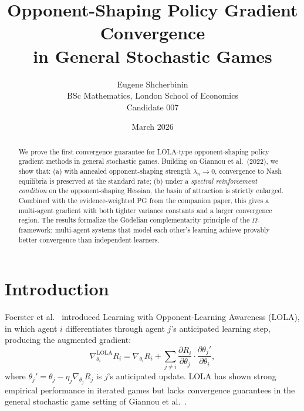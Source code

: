 \documentclass[11pt,a4paper]{article}
\title{Opponent-Shaping Policy Gradient Convergence\\in General Stochastic Games}
\author{Eugene Shcherbinin\\
\small BSc Mathematics, London School of Economics\\
\small Candidate 007}
\date{March 2026}
\begin{document}
\maketitle

\begin{abstract}
We prove the first convergence guarantee for LOLA-type opponent-shaping policy gradient methods in general stochastic games. Building on Giannou et al.\ (2022), we show that: (a) with annealed opponent-shaping strength $\lambda_n \to 0$, convergence to Nash equilibria is preserved at the standard rate; (b) under a \emph{spectral reinforcement condition} on the opponent-shaping Hessian, the basin of attraction is strictly enlarged. Combined with the evidence-weighted PG from the companion paper, this gives a multi-agent gradient with both tighter variance constants and a larger convergence region. The results formalize the Gödelian complementarity principle of the $\Omega$-framework: multi-agent systems that model each other's learning achieve provably better convergence than independent learners.
\end{abstract}

\tableofcontents


\section{Introduction}
\label{sec:intro}

Foerster et al.\ \cite{foerster2018} introduced Learning with Opponent-Learning Awareness (LOLA), in which agent $i$ differentiates through agent $j$'s anticipated learning step, producing the augmented gradient:
\begin{equation}
\label{eq:lola-intro}
    \nabla_{\theta_i}^{\text{LOLA}} R_i = \nabla_{\theta_i} R_i + \sum_{j \neq i} \frac{\partial R_i}{\partial \theta_j} \cdot \frac{\partial \theta_j'}{\partial \theta_i},
\end{equation}
where $\theta_j' = \theta_j - \eta_j \nabla_{\theta_j} R_j$ is $j$'s anticipated update. LOLA has shown strong empirical performance in iterated games but lacks convergence guarantees in the general stochastic game setting of Giannou et al.\ \cite{giannou2022}.
\end{document}
